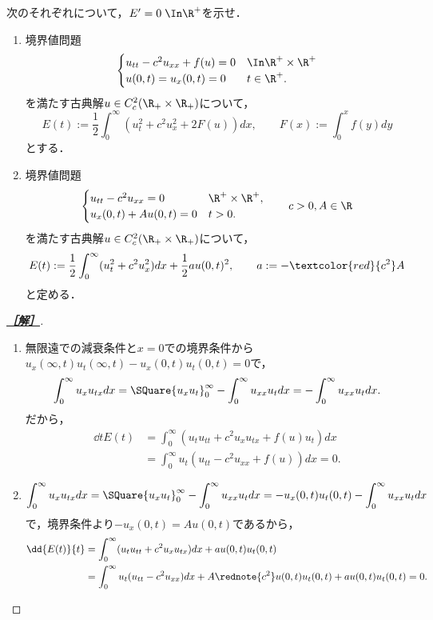 \documentclass[uplatex,dvipdfmx]{jsarticle}
\begin{document}
\begin{problem}
    次のそれぞれについて，$E'=0\;\In\R^+$を示せ．
    \begin{enumerate}
        \item 境界値問題
        \[\begin{cases}
            u_{tt}-c^2u_{xx}+f(u)=0&\In\R^+\times\R^+\\
            u(0,t)=u_x(0,t)=0&t\in\R^+.
        \end{cases}\]
        を満たす古典解$u\in C^2_c(\R_+\times\R_+)$について，
        \[E(t):=\frac{1}{2}\int^\infty_0(u_t^2+c^2u_x^2+2F(u))dx,\qquad F(x):=\int^x_0f(y)dy\]
        とする．
        \item 境界値問題
        \[\begin{cases}
            u_{tt}-c^2u_{xx}=0&\R^+\times\R^+,\\
            u_x(0,t)+Au(0,t)=0&t>0.
        \end{cases}\qquad c>0,A\in\R\]
        を満たす古典解$u\in C^2_c(\R_+\times\R_+)$について，
        \[E(t):=\frac{1}{2}\int^\infty_0(u_t^2+c^2u_x^2)dx+\frac{1}{2}au(0,t)^2,\qquad a:=-\textcolor{red}{c^2}A\]
        と定める．
    \end{enumerate}
\end{problem}
\begin{proof}[\bf\underline{［解］}]\mbox{}
    \begin{enumerate}
        \item 無限遠での減衰条件と$x=0$での境界条件から$u_x(\infty,t)u_t(\infty,t)-u_x(0,t)u_t(0,t)=0$で，
        \[\int^\infty_0u_xu_{tx}dx=\SQuare{u_xu_t}^\infty_0-\int^\infty_0u_{xx}u_tdx=-\int^\infty_0u_{xx}u_tdx.\]
        だから，
        \begin{align*}
            \dd{}{t}E(t)&=\int^\infty_0(u_tu_{tt}+c^2u_xu_{tx}+f(u)u_t)dx\\
            &=\int^\infty_0u_t(u_{tt}-c^2u_{xx}+f(u))dx=0.
        \end{align*}
        \item \[\int^\infty_0u_xu_{tx}dx=\SQuare{u_xu_t}^\infty_0-\int^\infty_0u_{xx}u_tdx=-u_x(0,t)u_t(0,t)-\int^\infty_0u_{xx}u_tdx\]
        で，境界条件より$-u_{x}(0,t)=Au(0,t)$であるから，
        \begin{align*}
            \dd{E(t)}{t}&=\int^\infty_0(u_tu_{tt}+c^2u_xu_{tx})dx+au(0,t)u_t(0,t)\\
            &=\int^\infty_0u_t(u_{tt}-c^2u_{xx})dx+A\rednote{c^2}u(0,t)u_t(0,t)+au(0,t)u_t(0,t)=0.
        \end{align*}
    \end{enumerate}
\end{proof}
\end{document}
